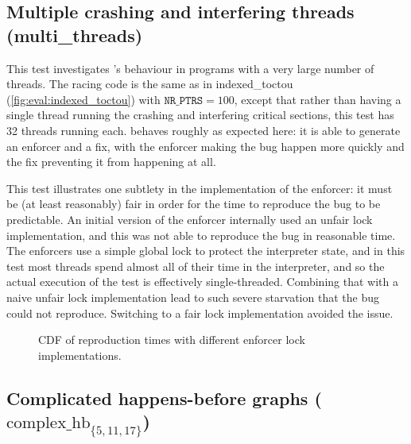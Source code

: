 \subsection{Multiple crashing and interfering threads (multi\_threads)}

This test investigates {\implementation}'s behaviour in programs with
a very large number of threads.  The racing code is the same as in
indexed\_toctou (\autoref{fig:eval:indexed_toctou}) with
$\texttt{NR\_PTRS} = 100$, except that rather than having a single
thread running the crashing and interfering critical sections, this
test has 32 threads running each.  {\Technique} behaves roughly as
expected here: it is able to generate an enforcer and a fix, with the
enforcer making the bug happen more quickly and the fix preventing it
from happening at all.

This test illustrates one subtlety in the implementation of the
enforcer: it must be (at least reasonably) fair in order for the time
to reproduce the bug to be predictable.  An initial version of the
enforcer internally used an unfair lock implementation, and this was
not able to reproduce the bug in reasonable time.  The
{\implementation} enforcers use a simple global lock to protect the
interpreter state, and in this test most threads spend almost all of
their time in the interpreter, and so the actual execution of the test
is effectively single-threaded.  Combining that with a naive unfair
lock implementation lead to such severe starvation that the bug could
not reproduce.  Switching to a fair lock implementation avoided the
issue.

\begin{figure}
  
  \caption{CDF of reproduction times with different enforcer lock
    implementations.}
  \label{fig:eval:multi_threads}
\end{figure}



\subsection{Complicated happens-before graphs ($\textrm{complex\_hb}_{\{5,11,17\}}$)}

